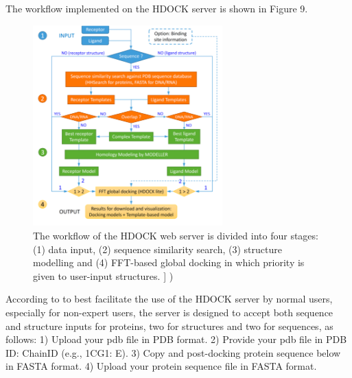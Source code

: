 \documentclass[11pt, letterpaper, english]{article}
\begin{document}
		\par {The workflow implemented on the HDOCK server is shown in Figure 9.}
        \begin{figure}
	    \centering
		\caption{The workflow of the HDOCK web server is divided into four stages: (1) data input, (2) sequence similarity search, (3) structure modelling and (4) FFT-based global docking in which priority is given to user-input structures. ] \cite{Yan_2017})}
		\includegraphics[width=0.65\textwidth]{Imagen 2.png}
	\end{figure}\textbf{}

\par According to \cite{Jo_2017} to best facilitate the use of the HDOCK server by normal users, especially for non-expert users, the server is designed to accept both sequence and structure inputs for proteins, two for structures and two for sequences, as follows:
1)	Upload your pdb file in PDB format.
2)	Provide your pdb file in PDB ID: ChainID (e.g., 1CG1: E). 
3)	Copy and post-docking protein sequence below in FASTA format.
4)	Upload your protein sequence file in FASTA format.
\end{document}
